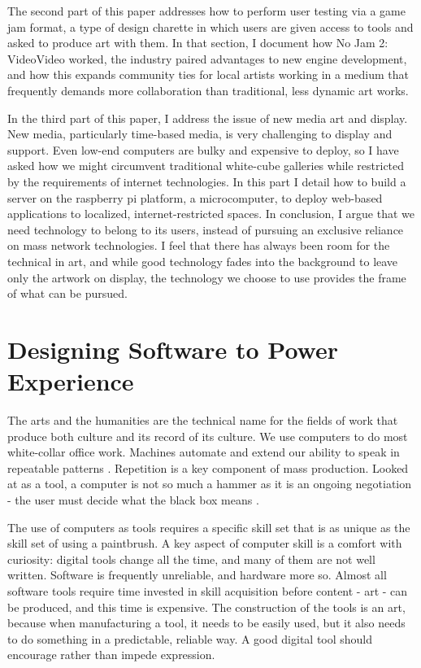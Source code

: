 The second part of this paper addresses how to perform user testing via a game jam format, a type of design charette in which users are given access to tools and asked to produce art with them. In that section, I document how No Jam 2: VideoVideo worked, the industry paired advantages to new engine development, and how this expands community ties for local artists working in a medium that frequently demands more collaboration than traditional, less dynamic art works.

In the third part of this paper, I address the issue of new media art and display. New media, particularly time-based media, is very challenging to display and support. Even low-end computers are bulky and expensive to deploy, so I have asked how we might circumvent traditional white-cube galleries while restricted by the requirements of internet technologies. In this part I detail how to build a server on the raspberry pi platform, a microcomputer, to deploy web-based applications to localized, internet-restricted spaces.
In conclusion, I argue that we need technology to belong to its users, instead of pursuing an exclusive reliance on mass network technologies. I feel that there has always been room for the technical in art, and while good technology fades into the background to leave only the artwork on display, the technology we choose to use provides the frame of what can be pursued.

\section{Designing Software to Power Experience}
The arts and the humanities are the technical name for the fields of work that produce both culture and its record of its culture. We use computers to do most white-collar office work. Machines automate and extend our ability to speak in repeatable patterns \parencite{glanville}. Repetition is a key component of mass production. Looked at as a tool, a computer is not so much a hammer as it is an ongoing negotiation - the user must decide what the black box means \parencite{glanville}.

The use of computers as tools requires a specific skill set that is as unique as the skill set of using a paintbrush. A key aspect of computer skill is a comfort with curiosity: digital tools change all the time, and many of them are not well written. Software is frequently unreliable, and hardware more so. Almost all software tools require time invested in skill acquisition before content - art - can be produced, and this time is expensive. The construction of the tools is an art, because when manufacturing a tool, it needs to be easily used, but it also needs to do something in a predictable, reliable way. A good digital tool should encourage rather than impede expression.

